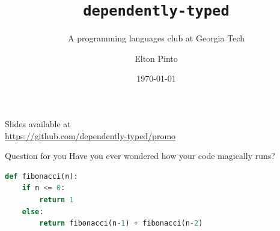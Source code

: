 \documentclass{beamer}
\title{\texttt{dependently-typed}}
\subtitle{A programming languages club at Georgia Tech}
\author{Elton Pinto}
\date{\today}
\begin{document}
\begin{frame}
  \titlepage
\end{frame}

\begin{frame}
  \begin{center}
    Slides available at \\
    \small\url{https://github.com/dependently-typed/promo}
  \end{center}
\end{frame}

\begin{frame}[fragile]{Question for you}
  Have you ever wondered how your code magically runs?

  \vspace{1cm}

  \begin{lstlisting}[language=Python]
def fibonacci(n):
    if n <= 0:
        return 1
    else:
        return fibonacci(n-1) + fibonacci(n-2)
  \end{lstlisting}
\end{frame}
\end{document}
